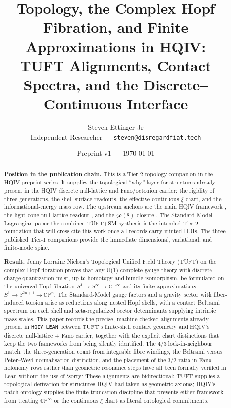 \documentclass[11pt]{article}
\title{Topology, the Complex Hopf Fibration, and Finite Approximations in HQIV:\\[0.35em]
TUFT Alignments, Contact Spectra, and the Discrete--Continuous Interface}
\author{Steven Ettinger Jr\\
{\small Independent Researcher --- \texttt{steven@disregardfiat.tech}}}
\date{Preprint v1 --- \today}
\begin{document}
\maketitle

\begin{abstract}
\noindent\textbf{Position in the publication chain.}
This is a Tier-2 topology companion in the HQIV preprint series. It supplies
the topological ``why'' layer for structures already present in the HQIV
discrete null-lattice and Fano/octonion carrier: the rigidity of three
generations, the shell-surface readouts, the effective continuous $\xi$
chart, and the informational-energy mass row. The upstream anchors are the
main HQIV framework \cite{ettinger2026hqiv}, the light-cone null-lattice
readout \cite{hqiv-lightcone-paper}, and the $\mathfrak{so}(8)$ closure
\cite{hqiv-so8-paper}. The Standard-Model Lagrangian paper
the combined TUFT+SM synthesis \cite{hqiv-tuft-sm-lagrangian-paper} is the intended Tier-2 foundation
that will cross-cite this work once all records carry minted DOIs. The
three published Tier-1 companions \cite{hqiv-3d-growth-paper,hqiv-oct-action-paper,hqiv-kirchhoff-paper}
provide the immediate dimensional, variational, and finite-mode spine.

\noindent\textbf{Result.}
Jenny Lorraine Nielsen's Topological Unified Field Theory (TUFT) on the
complex Hopf fibration \cite{NielsenTUFT2026} proves that any U(1)-complete
gauge theory with discrete charge quantization must, up to homotopy and
bundle isomorphism, be formulated on the universal Hopf fibration
$S^1\to S^\infty\to\mathbb{CP}^\infty$ and its finite approximations
$S^1\to S^{2n+1}\to\mathbb{CP}^n$. The Standard-Model gauge factors and a
gravity sector with fiber-induced torsion arise as reductions along nested
Hopf shells, with a contact Beltrami spectrum on each shell and
zeta-regularized sector determinants supplying intrinsic mass scales.
This paper records the precise, machine-checked alignments already present
in \texttt{HQIV\_LEAN} between TUFT's finite-shell contact geometry and
HQIV's discrete null-lattice + Fano carrier, together with the explicit
chart distinctions that keep the two frameworks from being silently
identified. The 4/3 lock-in-neighbour match, the three-generation
count from integrable fibre windings, the Beltrami versus Peter--Weyl
normalisation distinction, and the placement of the 3/2 ratio in Fano
holonomy rows rather than geometric resonance steps have all been
formally verified in Lean without the use of `sorry`. These alignments are bidirectional: TUFT supplies a
topological derivation for structures HQIV had taken as geometric axioms;
HQIV's patch ontology supplies the finite-truncation discipline that
prevents either framework from treating $\mathbb{CP}^\infty$ or the
continuous $\xi$ chart as literal ontological commitments.


\end{abstract}
\end{document}
